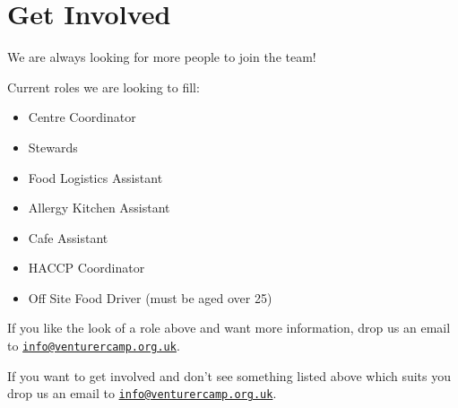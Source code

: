 \documentclass[a4paper, 11pt]{report}
\makeatletter
\newcommand{\nl}{\newline}
\newcommand{\infoemail}{\href{mailto:info@venturercamp.org.uk}{\texttt{info@venturercamp.org.uk}}}
\makeatother
\begin{document}
\chapter{Get Involved}
We are always looking for more people to join the team!\nl

Current roles we are looking to fill:
\begin{itemize}
    \item Centre Coordinator
    \item Stewards
    \item Food Logistics Assistant
    \item Allergy Kitchen Assistant
    \item Cafe Assistant
    \item HACCP Coordinator
    \item Off Site Food Driver (must be aged over 25)
\end{itemize}
If you like the look of a role above and want more information, drop us an email to \infoemail. \nl

If you want to get involved and don't see something listed above which suits you drop us an email to \infoemail. 

\backPage
\end{document}
